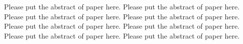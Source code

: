 Please put the abstract of paper here. Please put the abstract of paper here.
Please put the abstract of paper here. Please put the abstract of paper here.
Please put the abstract of paper here. Please put the abstract of paper here.
Please put the abstract of paper here. Please put the abstract of paper here.
